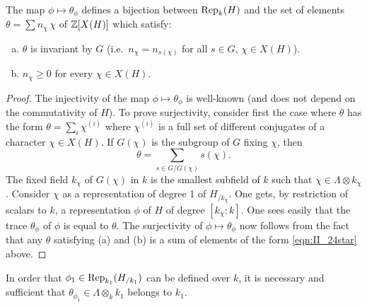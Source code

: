 \begin{prop}

The map $\phi \mapsto \theta_\phi$ defines a bijection between
$\operatorname{Rep}_k(H)$ and the set of elements $\theta = \sum n_\chi \, \chi$ of
$\mathbb{Z}[X(H)]$ which satisfy:
\begin{enumerate}[(a)]
	\item $\theta$ is invariant by $G$ (i.e.\ $n_\chi =
		n_{s(\chi)}$ for all $s \in G$, $\chi \in X(H)$).
	\item $n_\chi \ge 0$ for every $\chi \in X(H)$.
\end{enumerate}
\end{prop}
\begin{proof}
	The injectivity of the map $\phi \mapsto \theta_\phi$ is
	well-known (and does not depend on the commutativity of $H$). To prove
	surjectivity, consider first the case where $\theta$ has the form
	$\theta = \sum_{i} \chi^{(i)}$ where $\chi^{(i)}$ is a full set of
	different conjugates of a character $\chi \in X(H)$. If $G(\chi)$ is
	the subgroup of $G$ fixing $\chi$, then
	\begin{equation}
		\theta = \sum_{s \in G/G(\chi)} s(\chi).
		\tag{$*$}
		\label{eqn:II_24star}
	\end{equation}
	The fixed field $k_\chi$ of $G(\chi)$ in $k$ is the smallest subfield
	of $k$ such that $\chi \in \Lambda \otimes k_\chi$. Consider $\chi$ as
	a representation of degree 1 of $H_{/k_\chi}$. One gets, by restriction
	of scalars to $k$, a representation
	\dpage
	$\phi$ of $H$ of degree $[k_\chi : k]$. One sees easily that the
	trace $\theta_\phi$ of $\phi$ is equal to $\theta$. The
	surjectivity of $\phi \mapsto \theta_\phi$ now follows from the
	fact that any $\theta$ satisfying (a) and (b) is a sum of elements of
	the form \eqref{eqn:II_24star} above.
\end{proof}

\begin{corp}
In order that $\phi_1 \in \operatorname{Rep}_{k_1}(H_{/k_1})$ can be defined over $k$, it
is necessary and sufficient that $\theta_{\phi_1} \in \Lambda \otimes_k k_1$
belongs to $k_1$.
\end{corp}

